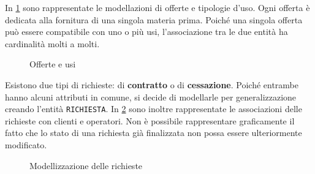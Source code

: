 \documentclass[a4paper,12pt]{report}
\begin{document}
In \cref{fig:plans-uses} sono rappresentate le modellazioni di offerte e tipologie d'uso. Ogni offerta è dedicata alla fornitura di una singola materia prima. Poiché una singola offerta può essere compatibile con uno o più usi, l'associazione tra le due entità ha cardinalità molti a molti.

\begin{figure}[H]
\centering{}
\caption{Offerte e usi}
\label{fig:plans-uses}
\end{figure}

Esistono due tipi di richieste: di \textbf{contratto} o di \textbf{cessazione}. Poiché entrambe hanno alcuni attributi in comune, si decide di modellarle per generalizzazione creando l'entità \texttt{RICHIESTA}. In \cref{fig:requests} sono inoltre rappresentate le associazioni delle richieste con clienti e operatori. Non è possibile rappresentare graficamente il fatto che lo stato di una richiesta già finalizzata non possa essere ulteriormente modificato.

\begin{figure}[H]
\centering{}
\caption{Modellizzazione delle richieste}
\label{fig:requests}
\end{figure}
\end{document}
